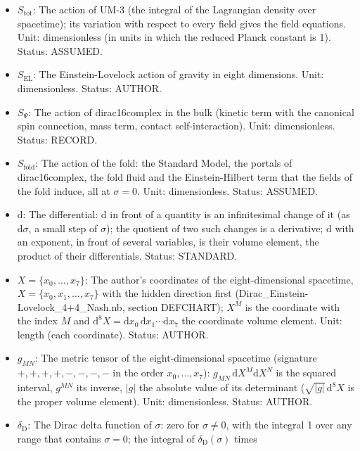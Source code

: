 \documentclass[
  10pt,
]{article}
\providecommand{\tightlist}{%
  \setlength{\itemsep}{0pt}\setlength{\parskip}{0pt}}
\begin{document}
\begin{itemize}
\tightlist
\item
  \(S_{\mathrm{tot}}\): The action of UM-3 (the integral of the
  Lagrangian density over spacetime); its variation with respect to
  every field gives the field equations. Unit: dimensionless (in units
  in which the reduced Planck constant is 1). Status: ASSUMED.
\item
  \(S_{\mathrm{EL}}\): The Einstein-Lovelock action of gravity in eight
  dimensions. Unit: dimensionless. Status: AUTHOR.
\item
  \(S_\Psi\): The action of dirac16complex in the bulk (kinetic term
  with the canonical spin connection, mass term, contact
  self-interaction). Unit: dimensionless. Status: RECORD.
\item
  \(S_{\mathrm{fold}}\): The action of the fold: the Standard Model, the
  portals of dirac16complex, the fold fluid and the Einstein-Hilbert
  term that the fields of the fold induce, all at \(\sigma = 0\). Unit:
  dimensionless. Status: ASSUMED.
\item
  \(\mathrm{d}\): The differential: \(\mathrm{d}\) in front of a
  quantity is an infinitesimal change of it (as \(\mathrm{d}\sigma\), a
  small step of \(\sigma\)); the quotient of two such changes is a
  derivative; \(\mathrm{d}\) with an exponent, in front of several
  variables, is their volume element, the product of their
  differentials. Status: STANDARD.
\item
  \(X = \{x_0, \dots, x_7\}\): The author's coordinates of the
  eight-dimensional spacetime, \(X = \{x_0, x_1, \dots, x_7\}\) with the
  hidden direction first (Dirac\_Einstein-Lovelock\_4+4\_Nash.nb,
  section DEFCHART); \(X^M\) is the coordinate with the index \(M\) and
  \(\mathrm{d}^8X = \mathrm{d}x_0\,\mathrm{d}x_1\cdots\mathrm{d}x_7\)
  the coordinate volume element. Unit: length (each coordinate). Status:
  AUTHOR.
\item
  \(g_{MN}\): The metric tensor of the eight-dimensional spacetime
  (signature \(+,+,+,+,-,-,-,-\) in the order \(x_0, \dots, x_7\)):
  \(g_{MN}\,\mathrm{d}X^M\mathrm{d}X^N\) is the squared interval,
  \(g^{MN}\) its inverse, \(\lvert g\rvert\) the absolute value of its
  determinant (\(\sqrt{\lvert g\rvert}\,\mathrm{d}^8X\) is the proper
  volume element). Unit: dimensionless. Status: AUTHOR.
\item
  \(\delta_{\mathrm{D}}\): The Dirac delta function of \(\sigma\): zero
  for \(\sigma \ne 0\), with the integral 1 over any range that contains
  \(\sigma = 0\); the integral of \(\delta_{\mathrm{D}}(\sigma)\) times

\end{itemize}
\end{document}
